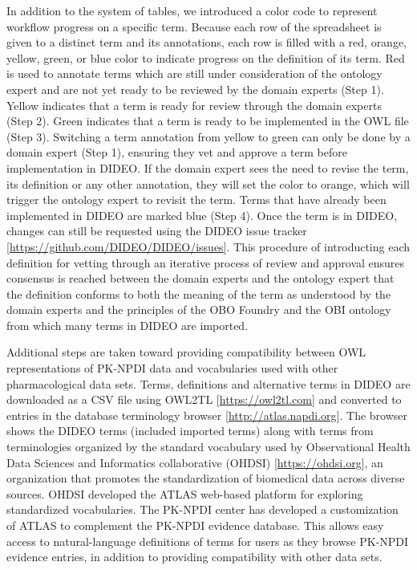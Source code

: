 \documentclass{bmcart}
\begin{document}
In addition to the system of tables, we introduced a color code to represent workflow progress on a specific term.
Because each row of the spreadsheet is given to a distinct term and its annotations, each row is filled with a red, orange, yellow, green, or blue color to indicate progress on the definition of its term.
Red is used to annotate terms which are still under consideration of the ontology expert and are not yet ready to be reviewed by the domain experts (Step 1).
Yellow indicates that a term is ready for review through the domain experts (Step 2).
Green indicates that a term is ready to be implemented in the OWL file (Step 3).
Switching a term annotation from yellow to green can only be done by a domain expert (Step 1), ensuring they vet and approve a term before implementation in DIDEO.
If the domain expert sees the need to revise the term, its definition or any other annotation, they will set the color to orange, which will trigger the ontology expert to revisit the term.
Terms that have already been implemented in DIDEO are marked blue (Step 4).
Once the term is in DIDEO, changes can still be requested using the DIDEO issue tracker [\url{https://github.com/DIDEO/DIDEO/issues}].
This procedure of introducting each definition for vetting through an iterative process of review and approval ensures consensus is reached between the domain experts and the ontology expert that the definition conforms to both the meaning of the term as understood by the domain experts and the principles of the OBO Foundry and the OBI ontology from which many terms in DIDEO are imported.

Additional steps are taken toward providing compatibility between OWL representations of PK-NPDI data and vocabularies used with other pharmacological data sets.
Terms, definitions and alternative terms in DIDEO are downloaded as a CSV file using OWL2TL [\url{https://owl2tl.com}] and converted to entries in the database terminology browser [\url{http://atlas.napdi.org}].
The browser shows the DIDEO terms (included imported terms) along with terms from terminologies organized by the standard vocabulary used by Observational Health Data Sciences and Informatics collaborative (OHDSI) [\url{https://ohdsi.org}], an organization that promotes the standardization of biomedical data across diverse sources.
OHDSI developed the ATLAS web-based platform for exploring standardized vocabularies.
The PK-NPDI center has  developed a customization of ATLAS to complement the PK-NPDI evidence database.
This allows easy access to natural-language definitions of terms for users as they browse PK-NPDI evidence entries, in addition to providing compatibility with other data sets.
\end{document}

